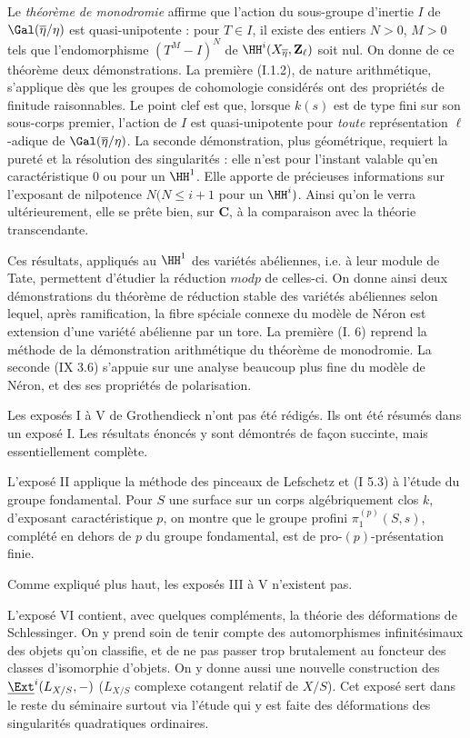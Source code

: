 Le \emph{théorème de monodromie} affirme que l'action du sous-groupe d'inertie $I$ de
$\Gal(\overline{{\eta}}/\eta)$ est quasi-unipotente : pour $T \in I$, il existe des entiers $N>0$,
$M>0$ tels que l'endomorphisme $(T^M - I)^N$ de $\HH^i(X_{\overline{\eta}}, \mathbf{Z}_{\ell})$
soit nul. On donne de ce théorème deux démonstrations. La première (I.1.2), de nature arithmétique,
s'applique dès que les groupes de cohomologie considérés ont des propriétés de finitude raisonnables.
Le point clef est que, lorsque $k(s)$ est de type fini sur son sous-corps premier, l'action de $I$ est
quasi-unipotente pour \emph{toute} représentation $\ell$-adique de $\Gal(\overline{{\eta}}/\eta)$.
La seconde démonstration, plus géométrique, requiert la pureté et la résolution des singularités : 
elle n'est pour l'instant valable qu'en caractéristique $0$ ou pour un $\HH^1$. Elle apporte de 
précieuses informations sur l'exposant de nilpotence $N (N \leq i+1$ pour un $\HH^i)$. Ainsi qu'on le
verra ultérieurement, elle se prête bien, sur $\mathbf{C}$, à la comparaison avec la théorie 
transcendante.

Ces résultats, appliqués au $\HH^1$ des variétés abéliennes, i.e. à leur module de Tate, permettent 
d'étudier la réduction $mod p$ de celles-ci. On donne ainsi deux démonstrations du théorème de réduction 
stable des variétés abéliennes selon lequel, après ramification, la fibre spéciale connexe du modèle de 
Néron est extension d'une variété abélienne par un tore. La première (I. 6) reprend la méthode de la 
démonstration arithmétique du théorème de monodromie. La seconde (IX 3.6) s'appuie sur une analyse 
beaucoup plus fine du modèle de Néron, et des ses propriétés de polarisation.

Les exposés I à V de Grothendieck n'ont pas été rédigés. Ils ont été résumés dans un exposé I.
Les résultats énoncés y sont démontrés de fa\c{c}on succinte, mais essentiellement complète.

L'exposé II applique la méthode des pinceaux de Lefschetz et (I 5.3) à l'étude du groupe fondamental. 
Pour $S$ une surface sur un corps algébriquement clos $k$, d'exposant caractéristique $p$, on montre
que le groupe profini $\pi^{(p)}_1(S, s)$, complété en dehors de $p$ du groupe fondamental, est de 
pro-$(p)$-présentation finie.

Comme expliqué plus haut, les exposés III à V n'existent pas.

L'exposé VI contient, avec quelques compléments, la théorie des déformations de Schlessinger. On y prend
soin de tenir compte des automorphismes infinitésimaux des objets qu'on classifie, et de ne pas passer 
trop brutalement au foncteur des classes d'isomorphie d'objets. On y donne aussi une nouvelle construction
des $\underline{\Ext}^i(L_{X/S}, -)$ ($L_{X/S}$ complexe cotangent relatif de $X/S$). Cet exposé sert dans
le reste du séminaire surtout via l'étude qui y est faite des déformations des singularités quadratiques
ordinaires.

